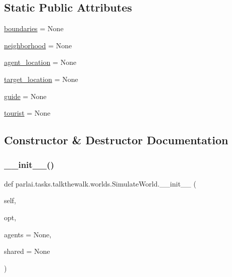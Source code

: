 \subsection*{Static Public Attributes}
\begin{DoxyCompactItemize}
\item 
\hyperlink{classparlai_1_1tasks_1_1talkthewalk_1_1worlds_1_1SimulateWorld_a4af404e8cd0ba091737ac83c212313db}{boundaries} = None
\item 
\hyperlink{classparlai_1_1tasks_1_1talkthewalk_1_1worlds_1_1SimulateWorld_abba0187065d0301544aeb3938776d567}{neighborhood} = None
\item 
\hyperlink{classparlai_1_1tasks_1_1talkthewalk_1_1worlds_1_1SimulateWorld_adc810464032ecbbcab43ae1469073bcc}{agent\+\_\+location} = None
\item 
\hyperlink{classparlai_1_1tasks_1_1talkthewalk_1_1worlds_1_1SimulateWorld_a0b116dd9980e163ec7a0565996677e97}{target\+\_\+location} = None
\item 
\hyperlink{classparlai_1_1tasks_1_1talkthewalk_1_1worlds_1_1SimulateWorld_af395c9415b1b93e19382a4fda023cf37}{guide} = None
\item 
\hyperlink{classparlai_1_1tasks_1_1talkthewalk_1_1worlds_1_1SimulateWorld_abfa37e958248323fcffa9455487dca0c}{tourist} = None
\end{DoxyCompactItemize}


\subsection{Constructor \& Destructor Documentation}
\mbox{\label{classparlai_1_1tasks_1_1talkthewalk_1_1worlds_1_1SimulateWorld_ab9073698c5054aaa0a605c946275cce4}} 
\subsubsection{\texorpdfstring{\+\_\+\+\_\+init\+\_\+\+\_\+()}{\_\_init\_\_()}}
{\footnotesize\ttfamily def parlai.\+tasks.\+talkthewalk.\+worlds.\+Simulate\+World.\+\_\+\+\_\+init\+\_\+\+\_\+ (\begin{DoxyParamCaption}\item[{}]{self,  }\item[{}]{opt,  }\item[{}]{agents = {\ttfamily None},  }\item[{}]{shared = {\ttfamily None} }\end{DoxyParamCaption})}



